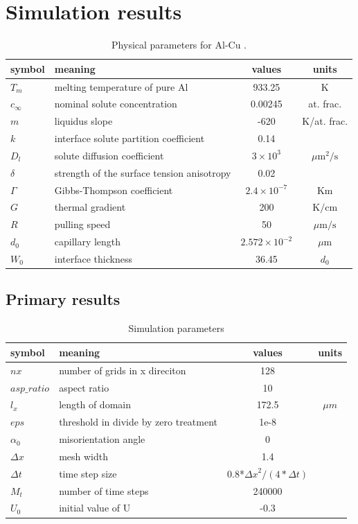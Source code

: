 \documentclass[final,times]{elsarticle}
\numberwithin{equation}{section}
\begin{document}
\section{Simulation results}

\begin{table}
\centering
\caption{Physical parameters for Al-Cu \cite{Takaki2014}.}
\begin{tabular}{l l c c }
\toprule
symbol & meaning & values & units \\
\midrule
$T_m$ & melting temperature of pure Al & 933.25  & K \\
$c_{\infty}$ & nominal solute concentration &  0.00245 & at. frac. \\
$m$ &liquidus slope &  -620 & K/at. frac. \\
$k$ & interface solute partition coefficient & 0.14 &\\
$D_l$ & solute diffusion coefficient &  $3\times 10^{3}$  & ${\mu\text{m}}^2/\text{s}$ \\
$\delta$ & strength of the surface tension anisotropy  &  0.02  &\\
$\Gamma$ & Gibbs-Thompson coefficient & $2.4\times 10^{-7}$ & Km \\
$G$ & thermal gradient & 200 & $\text{K} / \text{cm}$ \\
$R$ & pulling speed &  50 & $\mu \text{m} / \text{s}$ \\
$d_0$ & capillary length & $ 2.572\times10^{-2}$  & $\mu$m \\
$W_0$ & interface thickness  & 36.45 & $d_0$ \\
\bottomrule
\end{tabular}\label{tab:Takaki}

\end{table}

\subsection{Primary results}

\begin{table}
\centering
\caption{Simulation parameters}
\begin{tabular}{l l c c }
\toprule
symbol & meaning & values & units \\
\midrule
$nx$ & number of grids in x direciton & 128  &  \\
$asp\_ratio$ & aspect ratio &  10& \\
$l_x$ & length of domain &  172.5 &$\mu m$ \\
$eps$ & threshold in divide by zero treatment &1e-8 &\\
$\alpha_0$ & misorientation angle & 0  &  \\
$\Delta x$ & mesh width &  1.4  &\\
$\Delta t$ & time step size  &  0.8*${{\Delta x}^2}/({4*\Delta t})$  &\\
$M_t$ & number of time steps  &  240000  &\\
$U_0$ & initial value of U  &  -0.3  &\\
\bottomrule
\end{tabular}\label{tab:Takaki}
\end{table}
\end{document}
